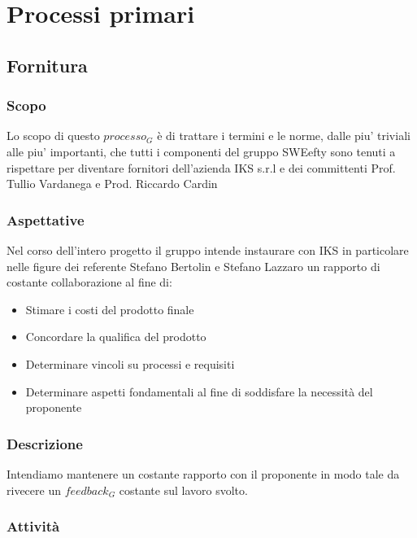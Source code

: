 \section{Processi primari}

\subsection{Fornitura}
	
	\subsubsection{Scopo}
		Lo scopo di questo $processo_G$ è di trattare i termini e le norme, dalle piu' triviali alle piu' importanti, che tutti i componenti del gruppo SWEefty sono tenuti a rispettare per diventare fornitori dell'azienda IKS s.r.l e dei committenti Prof. Tullio Vardanega e Prod. Riccardo Cardin
	\subsubsection{Aspettative}
	Nel corso dell'intero progetto il gruppo intende instaurare con IKS in particolare nelle figure dei referente Stefano Bertolin e Stefano Lazzaro un rapporto di costante collaborazione al fine di:
    \begin{itemize}
	\item Stimare i costi del prodotto finale
	\item Concordare la qualifica del prodotto 
	\item Determinare vincoli su processi e requisiti
	\item Determinare aspetti fondamentali al fine di soddisfare la necessità del proponente
	\end{itemize}
	\subsubsection{Descrizione}
	Intendiamo mantenere un costante rapporto con il proponente in modo tale da rivecere un $feedback_G$ costante sul lavoro svolto.
	\subsubsection{Attività} 
